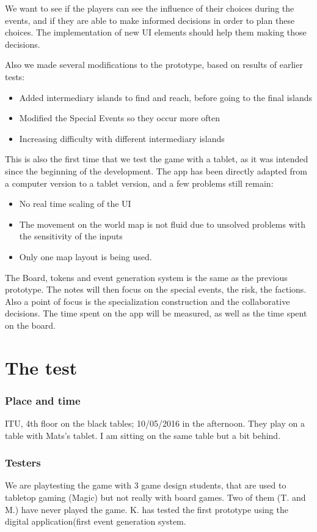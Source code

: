 \documentclass[a4paper,11pt]{report}
\begin{document}
We want to see if the players can see the influence of their choices during the events, and if they are able to make informed decisions in order to plan these choices. The implementation of new UI elements should help them making those decisions.

Also we made several modifications to the prototype, based on results of earlier tests:
\begin{itemize}
\item Added intermediary islands to find and reach, before going to the final islands
\item Modified the Special Events so they occur more often
\item Increasing difficulty with different intermediary islands
\end{itemize}

This is also the first time that we test the game with a tablet, as it was intended since the beginning of the development. The app has been directly adapted from a computer version to a tablet version, and a few problems still remain:
\begin{itemize}
\item No real time scaling of the UI
\item The movement on the world map is not fluid due to unsolved problems with the sensitivity of the inputs
\item Only one map layout is being used.
\end{itemize}

The Board, tokens and event generation system is the same as the previous prototype. The notes will then focus on the special events, the risk, the factions. Also a point of focus is the specialization construction and the collaborative decisions. The time spent on the app will be measured, as well as the time spent on the board.

\section{The test}

\subsubsection{Place and time}
ITU, 4th floor on the black tables; 10/05/2016 in the afternoon. They play on a table with Mats’s  tablet. I am sitting on the same table but a bit behind.

\subsubsection{Testers}
We are playtesting the game with 3 game design students, that are used to tabletop gaming (Magic) but not really with board games. Two of them (T. and M.) have never played  the game. K. has tested the first prototype using the digital application(first event generation system.
\end{document}
